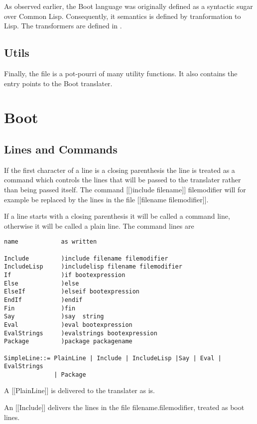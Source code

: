 \documentclass{article}
\begin{document}
As observed earlier, the Boot language was originally defined as a syntactic
sugar over Common Lisp.  Consequently, it semantics is defined by
tranformation to Lisp.  The transformers are defined in
.  

\subsection{Utils}
\label{sec:boot-to-cl:utils}

Finally, the file  is a pot-pourri of many utility
functions.  It also contains the entry points to the Boot translater.


\section{Boot}
\label{sec:boot}
 
\subsection{Lines and Commands}
 
If the first character of a line is a closing parenthesis the line
is treated as a command which controls the lines that will be
passed to the translater rather than being passed itself.
The command [[)include filename]] filemodifier will for example
be replaced by the lines in the file [[filename filemodifier]].
 
If a line starts with a closing parenthesis it will be called a command
line, otherwise it will be called a plain line.
The command lines are
\begin{verbatim} 
name            as written
 
Include         )include filename filemodifier
IncludeLisp     )includelisp filename filemodifier
If              )if bootexpression
Else            )else
ElseIf          )elseif bootexpression
EndIf           )endif
Fin             )fin
Say             )say  string
Eval            )eval bootexpression
EvalStrings     )evalstrings bootexpression
Package         )package packagename
 
SimpleLine::= PlainLine | Include | IncludeLisp |Say | Eval | EvalStrings
              | Package
\end{verbatim} 

A [[PlainLine]] is delivered to the translater as is.
 
An [[Include]] delivers the lines in the file filename.filemodifier,
treated as boot lines.
 
\end{document}
